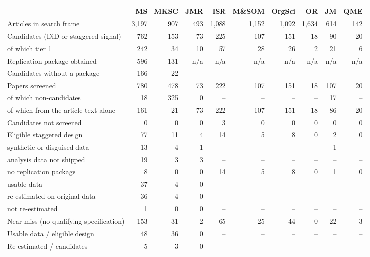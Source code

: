 \begin{tabular}{lrrrrrrrrr}
\toprule
 & MS & MKSC & JMR & ISR & M\&SOM & OrgSci & OR & JM & QME \\
\midrule
Articles in search frame & 3,197 & 907 & 493 & 1,088 & 1,152 & 1,092 & 1,634 & 614 & 142 \\
Candidates (DiD or staggered signal) & 762 & 153 & 73 & 225 & 107 & 151 & 18 & 90 & 20 \\
\quad of which tier 1 & 242 & 34 & 10 & 57 & 28 & 26 & 2 & 21 & 6 \\
Replication package obtained & 596 & 131 & n/a & n/a & n/a & n/a & n/a & n/a & n/a \\
Candidates without a package & 166 & 22 & -- & -- & -- & -- & -- & -- & -- \\
Papers screened & 780 & 478 & 73 & 222 & 107 & 151 & 18 & 107 & 20 \\
\quad of which non-candidates & 18 & 325 & 0 & -- & -- & -- & -- & 17 & -- \\
\quad of which from the article text alone & 161 & 21 & 73 & 222 & 107 & 151 & 18 & 86 & 20 \\
Candidates not screened & 0 & 0 & 0 & 3 & 0 & 0 & 0 & 0 & 0 \\
Eligible staggered design & 77 & 11 & 4 & 14 & 5 & 8 & 0 & 2 & 0 \\
\quad synthetic or disguised data & 13 & 4 & 1 & -- & -- & -- & -- & 1 & -- \\
\quad analysis data not shipped & 19 & 3 & 3 & -- & -- & -- & -- & -- & -- \\
\quad no replication package & 8 & 0 & 0 & 14 & 5 & 8 & 0 & 1 & 0 \\
\quad usable data & 37 & 4 & 0 & -- & -- & -- & -- & -- & -- \\
\qquad re-estimated on original data & 36 & 4 & 0 & -- & -- & -- & -- & -- & -- \\
\qquad not re-estimated & 1 & 0 & 0 & -- & -- & -- & -- & -- & -- \\
\midrule
Near-miss (no qualifying specification) & 153 & 31 & 2 & 65 & 25 & 44 & 0 & 22 & 3 \\
\midrule
Usable data / eligible design & 48 & 36 & 0 & -- & -- & -- & -- & -- & -- \\
Re-estimated / candidates & 5 & 3 & 0 & -- & -- & -- & -- & -- & -- \\
\bottomrule
\end{tabular}
